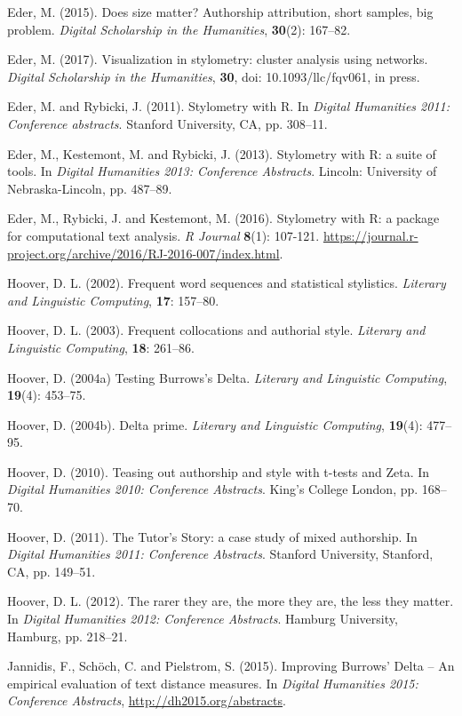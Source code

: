 \documentclass[11pt,a4paper]{article}
\begin{document}
Eder, M. (2015). Does size matter? Authorship attribution, short samples,
big problem. \textit{Digital Scholarship in the Humanities}, \textbf{30}(2):
167--82.

Eder, M. (2017). Visualization in stylometry: cluster analysis 
using networks. \textit{Digital Scholarship in the Humanities}, 
\textbf{30}, doi: 10.1093/llc/fqv061, in press.

Eder, M. and Rybicki, J. (2011). Stylometry with R. In \textit{Digital
Humanities 2011: Conference abstracts}. Stanford University, CA, pp.
308--11.

Eder, M., Kestemont, M. and Rybicki, J. (2013). Stylometry with R: a suite 
of tools. In \textit{Digital Humanities 2013: Conference Abstracts}. 
Lincoln: University of Nebraska-Lincoln, pp. 487--89.

Eder, M., Rybicki, J. and Kestemont, M. (2016). Stylometry with R: a package 
for computational text analysis. \textit{R Journal} \textbf{8}(1): 107-121.
\url{https://journal.r-project.org/archive/2016/RJ-2016-007/index.html}.

Hoover, D. L. (2002). Frequent word sequences and statistical stylistics.
\textit{Literary and Linguistic Computing}, \textbf{17}: 157--80.

Hoover, D. L. (2003). Frequent collocations and authorial style. 
\textit{Literary and Linguistic Computing}, \textbf{18}: 261--86.

Hoover, D. (2004a) Testing Burrows’s Delta. \textit{Literary and Linguistic
Computing}, \textbf{19}(4): 453--75.

Hoover, D. (2004b). Delta prime. \textit{Literary and Linguistic Computing},
\textbf{19}(4): 477--95.

Hoover, D. (2010). Teasing out authorship and style with t-tests and
Zeta. In \textit{Digital Humanities 2010: Conference Abstracts}. King's
College London, pp. 168--70.

Hoover, D. (2011). The Tutor's Story: a case study of mixed authorship.
In \textit{Digital Humanities 2011: Conference Abstracts}. Stanford
University, Stanford, CA, pp. 149--51.

Hoover, D. L. (2012). The rarer they are, the more they are, the less
they matter. In \textit{Digital Humanities 2012: Conference Abstracts}.
Hamburg University, Hamburg, pp. 218--21.

Jannidis, F., Sch\"och, C. and Pielstrom, S. (2015). Improving Burrows’ 
Delta – An empirical evaluation of text distance measures. In
\textit{Digital Humanities 2015: Conference Abstracts}, 
\url{http://dh2015.org/abstracts}.
\end{document}
